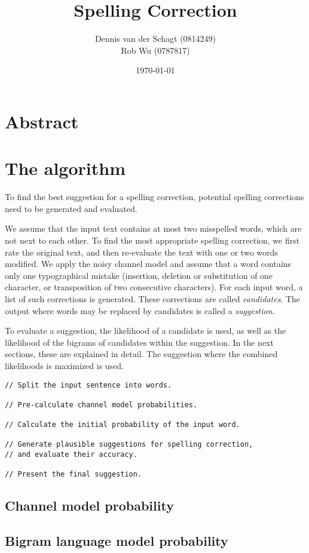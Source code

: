 \documentclass[11pt,a4paper]{article}
\title{Spelling Correction}
\author{
Dennis van der Schagt (0814249)\\
Rob Wu (0787817)
}
\date{\today}
\begin{document}
\maketitle
\newpage
\section*{Abstract}


\section{The algorithm}
To find the best suggestion for a spelling correction, potential spelling corrections need to be generated and evaluated.

We assume that the input text contains at most two misspelled words, which are not next to each other.
To find the most appropriate spelling correction, we first rate the original text, and then re-evaluate the text with one or two words modified.
We apply the noisy channel model and assume that a word contains only one typographical mistake (insertion, deletion or substitution of one character, or transposition of two consecutive characters). For each input word, a list of such corrections is generated. These corrections are called \textit{candidates}. The output where words may be replaced by candidates is called a \textit{suggestion}.

To evaluate a suggestion, the likelihood of a candidate is used, as well as the likelihood of the bigrams of candidates within the suggestion.
In the next sections, these are explained in detail. The suggestion where the combined likelihoods is maximized is used.

\begin{lstlisting}
// Split the input sentence into words.

// Pre-calculate channel model probabilities.

// Calculate the initial probability of the input word.

// Generate plausible suggestions for spelling correction,
// and evaluate their accuracy.

// Present the final suggestion.
\end{lstlisting}

\subsection{Channel model probability}
\subsection{Bigram language model probability}
\end{document}
